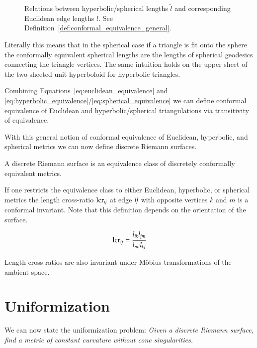 \documentclass[Thesis.tex]{subfiles}
\begin{document}
\begin{figure}
\centering
\scalebox{0.5}{}
\caption[Conformal equivalence of Euclidean and hyperbolic/spherical metrics]{Relations between hyperbolic/spherical lengths $\tilde l$ and corresponding Euclidean edge lengths $l$. See Definition~\ref{def:conformal_equivalence_general}.}
\label{fig:conformal_equivalence_sph_hyp}
\end{figure}

Literally this means that in the spherical case if a triangle is fit onto the sphere the conformally equivalent spherical lengths are the lengths of spherical geodesics connecting the triangle vertices. 
The same intuition holds on the upper sheet of the two-sheeted unit hyperboloid for hyperbolic triangles.

Combining Equations~\ref{eq:euclidean_equivalence} and \ref{eq:hyperbolic_equivalence}/\ref{eq:spherical_equivalence} we can define conformal equivalence of Euclidean and hyperbolic/spherical triangulations via transitivity of equivalence.

With this general notion of conformal equivalence of Euclidean, hyperbolic, and spherical metrics we can now define discrete Riemann surfaces.

\begin{definition}
\label{def:discrete_riemann_surface}
A discrete Riemann surface is an equivalence class of discretely conformally equivalent metrics.
\end{definition}

If one restricts the equivalence class to either Euclidean, hyperbolic, or spherical metrics the length cross-ratio $\mathrm{lcr}_{\it{ij}}$ at edge $\it{ij}$ with opposite vertices $k$ and $m$ is a conformal invariant. Note that this definition depends on the orientation of the surface.

\begin{equation}
	\mathrm{lcr}_{\it{ij}} = \frac{l_{\it{ik}} l_{\it{jm}}} {l_{\it{mi}} l_{\it{kj}}} \label{eq:length_cross_ratio}
\end{equation}

Length cross-ratios are also invariant under M{\"o}bius transformations of the ambient space.


\section{Uniformization}
We can now state the uniformization problem:
\emph{Given a discrete Riemann surface, find a metric of constant curvature
without cone singularities.}
\end{document}

